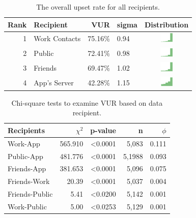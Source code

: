 \documentclass[conference]{IEEEtran}
\begin{document}
\begin{table}[t]
\begin{center}
\small
\begin{tabular}{| r | l | r | l |c |}
\hline
Rank & Recipient & VUR & sigma & Distribution \\
\hline
1 & Work Contacts & 75.16\% & 0.94 & \includegraphics[width = 2cm, height = 0.5cm]{tex-inputs/recipient4/recipient_work} \\
2 & Public & 72.41\% & 0.98 & \includegraphics[width = 2cm, height = 0.5cm]{tex-inputs/recipient4/recipient_pub}  \\
3 & Friends & 69.47\% & 1.02 & \includegraphics[width = 2cm, height = 0.5cm]{tex-inputs/recipient4/recipient_friends}\\
4 & App's Server & 42.28\% & 1.15 & \includegraphics[width = 2cm, height = 0.5cm]{tex-inputs/recipient4/recipient_app}\\
\hline
\end{tabular}
\caption{The overall upset rate for all recipients.}
\label{recipient-vur}
\end{center}
\end{table}

\begin{table}[t]
\small
\begin{center}
\begin{tabular}{|l|r|r|r|r|}
\hline
Recipients	& $\chi^2$ & p-value 	& n & $\phi$ \\
\hline
Work-App	& 565.910 & \textless0.0001 & 5,083 & 0.111\\
Public-App	& 481.776 & \textless0.0001 & 5,1988& 0.093\\
Friends-App & 381.653 & \textless0.0001 & 5,096 & 0.075\\
Friends-Work & 20.39 & \textless0.0001 & 5,037 & 0.004\\
Friends-Public & 5.41 & \textless0.0200 & 5,142 & 0.001\\
Work-Public&  5.00 & \textless0.0253 & 5,129	& 0.001\\
\hline
\end{tabular}
\caption{Chi-square tests to examine VUR based on data recipient.}
\label{recipient-chi}
\end{center}
\end{table}
\end{document}
